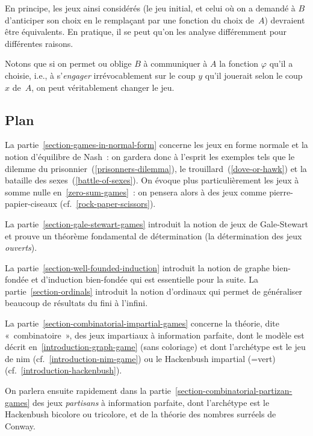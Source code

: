 \documentclass[12pt,a4paper]{article}
\theoremstyle{definition}
\begin{document}
En principe, les jeux ainsi considérés (le jeu initial, et celui où on
a demandé à $B$ d'anticiper son choix en le remplaçant par une
fonction du choix de $A$) devraient être équivalents.  En pratique, il
se peut qu'on les analyse différemment pour différentes raisons.

Notons que si on permet ou oblige $B$ à communiquer à $A$ la fonction
$\varphi$ qu'il a choisie, i.e., à s'\emph{engager} irrévocablement
sur le coup $y$ qu'il jouerait selon le coup $x$ de $A$, on peut
véritablement changer le jeu.


\subsection{Plan}

La partie \ref{section-games-in-normal-form} concerne les jeux en
forme normale et la notion d'équilibre de Nash : on gardera donc à
l'esprit les exemples tels que le dilemme du
prisonnier (\ref{prisonners-dilemma}), le
trouillard (\ref{dove-or-hawk}) et la bataille des
sexes (\ref{battle-of-sexes}).  On évoque plus particulièrement les
jeux à somme nulle en \ref{zero-sum-games} : on pensera alors à des
jeux comme pierre-papier-ciseaux (cf. \ref{rock-paper-scissors}).

La partie \ref{section-gale-stewart-games} introduit la notion de jeux de
Gale-Stewart et prouve un théorème fondamental de détermination (la
détermination des jeux \emph{ouverts}).

La partie \ref{section-well-founded-induction} introduit la notion de
graphe bien-fondée et d'induction bien-fondée qui est essentielle pour
la suite.  La partie \ref{section-ordinals} introduit la notion
d'ordinaux qui permet de généraliser beaucoup de résultats du fini à
l'infini.

La partie \ref{section-combinatorial-impartial-games} concerne la
théorie, dite « combinatoire », des jeux impartiaux à information
parfaite, dont le modèle est décrit en \ref{introduction-graph-game}
(sans coloriage) et dont l'archétype est le jeu de nim
(cf. \ref{introduction-nim-game}) ou le Hackenbush impartial (=vert)
(cf. \ref{introduction-hackenbush}).

On parlera ensuite rapidement dans la
partie \ref{section-combinatorial-partizan-games} des jeux
\emph{partisans} à information parfaite, dont l'archétype est le
Hackenbush bicolore ou tricolore, et de la théorie des nombres
surréels de Conway.


%
%
%
\end{document}
